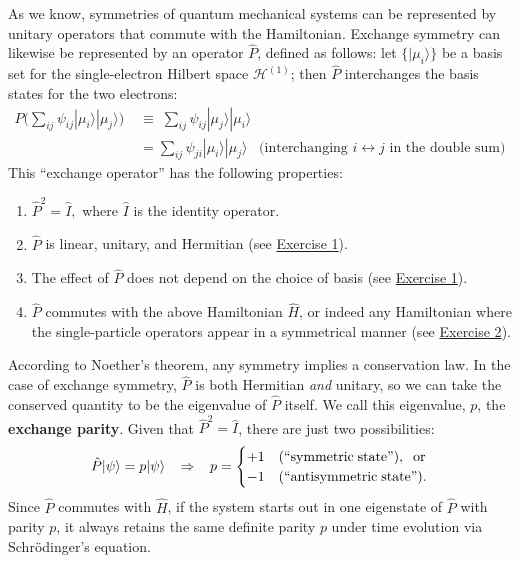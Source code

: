 \documentclass[pra,12pt]{revtex4}
\begin{document}
As we know, symmetries of quantum mechanical systems can be
represented by unitary operators that commute with the Hamiltonian.
Exchange symmetry can likewise be represented by an operator
$\hat{P}$, defined as follows: let $\{|\mu_i\rangle\}$ be a basis set
for the single-electron Hilbert space $\mathscr{H}^{(1)}$; then
$\hat{P}$ interchanges the basis states for the two electrons:
$$\begin{aligned}P \Big (\sum_{ij} \psi_{ij} |\mu_i\rangle|\mu_j\rangle \Big)
\;&\equiv\;  \sum_{ij} \psi_{ij} |\mu_j\rangle|\mu_i\rangle \\&= \sum_{ij} \psi_{ji} |\mu_i\rangle|\mu_j\rangle \;\;\;\textrm{(interchanging $i\leftrightarrow j$ in the double sum)}\end{aligned}$$
This ``exchange operator'' has the following properties:
\begin{enumerate}
\item $\hat{P}^2 = \hat{I},$ where $\hat{I}$ is the identity operator.

\item $\hat{P}$ is linear, unitary, and Hermitian (see
  \hyperref[ex:1]{Exercise 1}).
  
\item The effect of $\hat{P}$ does not depend on the choice
  of basis (see \hyperref[ex:1]{Exercise 1}).

\item $\hat{P}$ commutes with the above Hamiltonian $\hat{H}$, or
  indeed any Hamiltonian where the single-particle operators appear in
  a symmetrical manner (see \hyperref[ex:2]{Exercise 2}).
\end{enumerate}

According to Noether's theorem, any symmetry implies a conservation
law.  In the case of exchange symmetry, $\hat{P}$ is both Hermitian
\textit{and} unitary, so we can take the conserved quantity to be the
eigenvalue of $\hat{P}$ itself.  We call this eigenvalue, $p$, the
\textbf{exchange parity}.  Given that $\hat{P}^2 = \hat{I}$, there are
just two possibilities:
$$\hat{P} |\psi\rangle = p|\psi\rangle \;\;\;\Rightarrow\;\;\; p = \begin{cases}+1 & \textrm{(``symmetric\;state'')}, \;\;\textrm{or} \\ -1 & \textrm{(``antisymmetric\;state'').}\end{cases}$$
Since $\hat{P}$ commutes with $\hat{H}$, if the system starts out in
one eigenstate of $\hat{P}$ with parity $p$, it always retains the
same definite parity $p$ under time evolution via Schr\"odinger's
equation.
\end{document}
